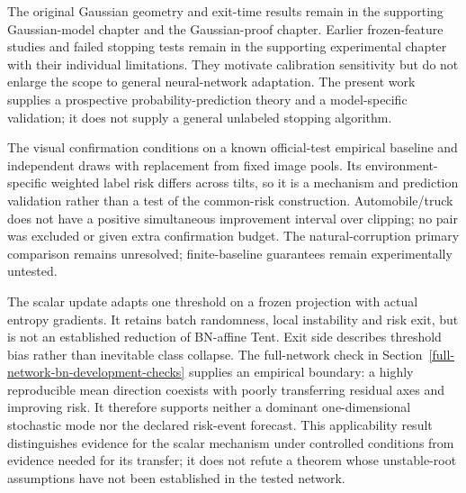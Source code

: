 The original Gaussian geometry and exit-time results remain in the supporting Gaussian-model chapter and the Gaussian-proof chapter. Earlier frozen-feature studies and failed stopping tests remain in the supporting experimental chapter with their individual limitations. They motivate calibration sensitivity but do not enlarge the scope to general neural-network adaptation. The present work supplies a prospective probability-prediction theory and a model-specific validation; it does not supply a general unlabeled stopping algorithm.

The visual confirmation conditions on a known official-test empirical baseline and independent draws with replacement from fixed image pools. Its environment-specific weighted label risk differs across tilts, so it is a mechanism and prediction validation rather than a test of the common-risk construction. Automobile/truck does not have a positive simultaneous improvement interval over clipping; no pair was excluded or given extra confirmation budget. The natural-corruption primary comparison remains unresolved; finite-baseline guarantees remain experimentally untested.

The scalar update adapts one threshold on a frozen projection with actual entropy gradients. It retains batch randomness, local instability and risk exit, but is not an established reduction of BN-affine Tent. Exit side describes threshold bias rather than inevitable class collapse. The full-network check in Section~\ref{full-network-bn-development-checks} supplies an empirical boundary: a highly reproducible mean direction coexists with poorly transferring residual axes and improving risk. It therefore supports neither a dominant one-dimensional stochastic mode nor the declared risk-event forecast. This applicability result distinguishes evidence for the scalar mechanism under controlled conditions from evidence needed for its transfer; it does not refute a theorem whose unstable-root assumptions have not been established in the tested network.
